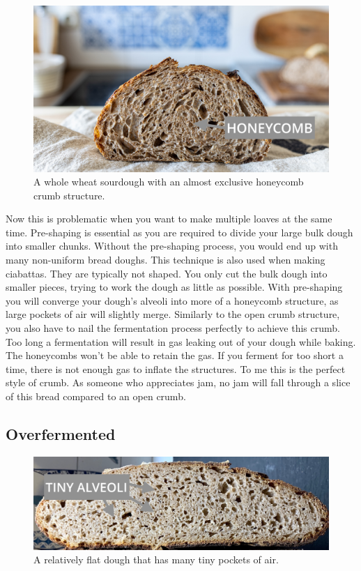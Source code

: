 \begin{figure}
  \includegraphics[width=\textwidth]{honeycomb}
  \caption{A whole wheat sourdough with an almost exclusive honeycomb crumb structure.}
  \label{fig:honeycomb}
\end{figure}


Now this is problematic when you want to
make multiple loaves at the same time. Pre-shaping is essential as you are required
to divide your large bulk dough into smaller chunks. Without the pre-shaping
process, you would end up with many non-uniform bread doughs. This technique is
also used when making ciabattas. They are typically not shaped. You only cut the
bulk dough into smaller pieces, trying to work the dough as little as possible.
With pre-shaping you will converge your dough's alveoli into more of a honeycomb structure,
as large pockets of air will slightly merge. Similarly to the open crumb structure,
you also have to nail the fermentation process perfectly to achieve this crumb.
Too long a fermentation will result in gas leaking out of your dough while baking.
The honeycombs won't be able to retain the gas. If you ferment for too short a time,
there is not enough gas to inflate the structures. To me this is the perfect
style of crumb. As someone who appreciates jam, no jam will fall through a slice
of this bread compared to an open crumb.

\subsection{Overfermented}
\label{sec:overfermented-dough}

\begin{figure}
  \includegraphics[width=\textwidth]{fermented-too-long}
  \caption{A relatively flat dough that has many tiny pockets of air.}
  \label{fig:fermented-too-long}
\end{figure}

